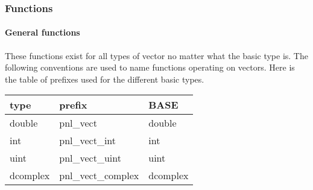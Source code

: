 \subsubsection{Functions}

\paragraph{General functions}
These functions exist for all types of vector no matter what the basic type
is. The following conventions are used to name functions operating on vectors.
Here is the table of prefixes used for the different basic types.

\begin{center}
  \begin{tabular}[t]{lll}
    type & prefix & BASE\\
    \hline
    double & pnl_vect & double \\
    \hline
    int & pnl_vect_int & int \\
    \hline
    uint & pnl_vect_uint & uint\\
    \hline
    dcomplex & pnl_vect_complex & dcomplex
  \end{tabular}
\end{center}


